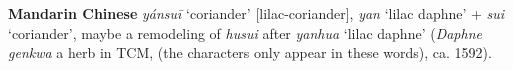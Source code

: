 \begin{etymology}\label{ety:yansui}
\textbf{Mandarin Chinese}  \textit{yánsuī} `coriander' [lilac-coriander], \textit{yan} `lilac daphne' + \textit{sui} `coriander', maybe a remodeling of  \textit{husui} after  \textit{yanhua} `lilac daphne' (\textit{Daphne genkwa} a herb in TCM, (the characters only appear in these words), ca. 1592).
\end{etymology}